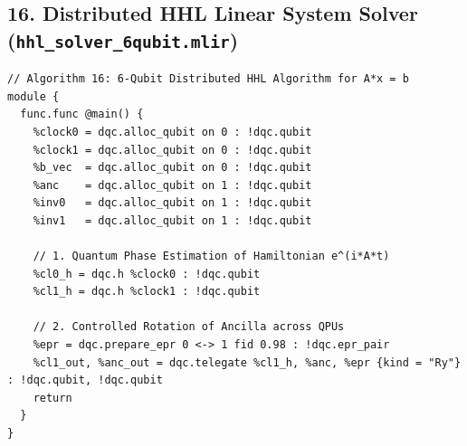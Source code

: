 \subsection{16. Distributed HHL Linear System Solver (\texttt{hhl\_solver\_6qubit.mlir})}
\begin{lstlisting}[language=MLIR, caption={hhl\_solver\_6qubit.mlir}]
// Algorithm 16: 6-Qubit Distributed HHL Algorithm for A*x = b
module {
  func.func @main() {
    %clock0 = dqc.alloc_qubit on 0 : !dqc.qubit
    %clock1 = dqc.alloc_qubit on 0 : !dqc.qubit
    %b_vec  = dqc.alloc_qubit on 0 : !dqc.qubit
    %anc    = dqc.alloc_qubit on 1 : !dqc.qubit
    %inv0   = dqc.alloc_qubit on 1 : !dqc.qubit
    %inv1   = dqc.alloc_qubit on 1 : !dqc.qubit

    // 1. Quantum Phase Estimation of Hamiltonian e^(i*A*t)
    %cl0_h = dqc.h %clock0 : !dqc.qubit
    %cl1_h = dqc.h %clock1 : !dqc.qubit

    // 2. Controlled Rotation of Ancilla across QPUs
    %epr = dqc.prepare_epr 0 <-> 1 fid 0.98 : !dqc.epr_pair
    %cl1_out, %anc_out = dqc.telegate %cl1_h, %anc, %epr {kind = "Ry"} : !dqc.qubit, !dqc.qubit
    return
  }
}
\end{lstlisting}
